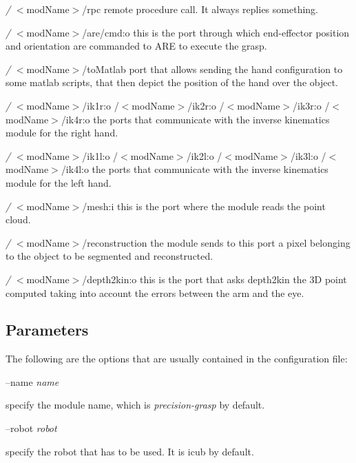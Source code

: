 \begin{DoxyItemize}
\item {\itshape /} $<$mod\+Name$>$/rpc remote procedure call. It always replies something.
\item {\itshape /} $<$mod\+Name$>$/are/cmd\+:o this is the port through which end-\/effector position and orientation are commanded to A\+R\+E to execute the grasp.
\item {\itshape /} $<$mod\+Name$>$/to\+Matlab port that allows sending the hand configuration to some matlab scripts, that then depict the position of the hand over the object.
\item {\itshape /} $<$mod\+Name$>$/ik1r\+:o /$<$mod\+Name$>$/ik2r\+:o /$<$mod\+Name$>$/ik3r\+:o /$<$mod\+Name$>$/ik4r\+:o the ports that communicate with the inverse kinematics module for the right hand.
\item {\itshape /} $<$mod\+Name$>$/ik1l\+:o /$<$mod\+Name$>$/ik2l\+:o /$<$mod\+Name$>$/ik3l\+:o /$<$mod\+Name$>$/ik4l\+:o the ports that communicate with the inverse kinematics module for the left hand.
\item {\itshape /} $<$mod\+Name$>$/mesh\+:i this is the port where the module reads the point cloud.
\item {\itshape /} $<$mod\+Name$>$/reconstruction the module sends to this port a pixel belonging to the object to be segmented and reconstructed.
\item {\itshape /} $<$mod\+Name$>$/depth2kin\+:o this is the port that asks depth2kin the 3\+D point computed taking into account the errors between the arm and the eye.
\end{DoxyItemize}\hypertarget{group__handIKModule_parameters_sec}{}\subsection{Parameters}\label{group__handIKModule_parameters_sec}
The following are the options that are usually contained in the configuration file\+:

--name {\itshape name} 
\begin{DoxyItemize}
\item specify the module name, which is {\itshape precision-\/grasp} by default.
\end{DoxyItemize}

--robot {\itshape robot} 
\begin{DoxyItemize}
\item specify the robot that has to be used. It is icub by default.
\end{DoxyItemize}

